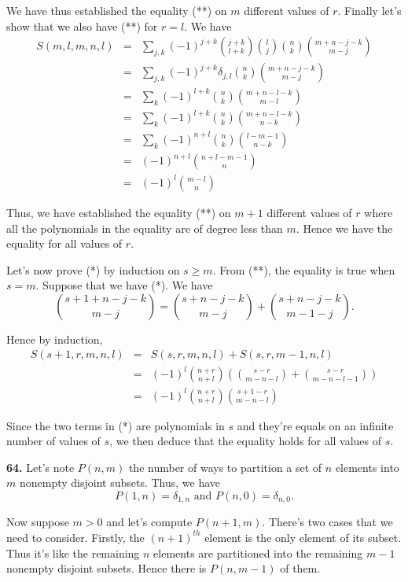 \documentclass[a4paper,12pt]{article}
\newcommand{\newpar}[1]{\bigskip \noindent \textbf{#1.}}
\begin{document}
We have thus established the equality (**) on $m$ different values of
$r$.  Finally let's show that we also have (**) for $r = l$.   We have
\begin{eqnarray*}
  S(m,l,m,n,l) &=& \sum_{j,k}(-1)^{j+k}{j+k \choose l+k}{l \choose
    j}{n \choose k}{m+n-j-k\choose m-j} \\
  &=& \sum_{j,k} (-1)^{j+k} \delta_{j,l} {n \choose k}{m+n-j-k \choose
    m-j} \\
  &=& \sum_k (-1)^{l+k}{n \choose k}{m+n-l-k \choose m-l} \\
  &=& \sum_k (-1)^{l+k}{n \choose k}{m+n-l-k \choose n-k} \\
  &=& \sum_k (-1)^{n+l}{n \choose k}{l-m-1 \choose n-k} \\
  &=& (-1)^{n+l} {n+l-m-1 \choose n} \\
  &=& (-1)^l {m-l \choose n}
\end{eqnarray*}

Thus, we have established the equality (**) on $m+1$ different values
of $r$ where all the polynomials in the equality are of degree less
than $m$.  Hence we have the equality for all values of $r$.

Let's now prove (*) by induction on $s \ge m$.  From (**), the
equality is true when $s = m$.  Suppose that we have (*).  We have
\[ {s+1 + n-j-k\choose m-j} = {s+n-j-k\choose m-j} + {s+n-j-k\choose
  m-1-j}.\]

Hence by induction,
\begin{eqnarray*}
  S(s+1, r, m, n, l) &=& S(s, r, m, n, l) + S(s, r, m-1, n, l) \\
  &=& (-1)^l {n+r\choose n+l}\left({s-r\choose m-n-l} + {s-r\choose
    m-n-l-1}\right) \\
  &=& (-1)^l {n+r \choose n+l}{s+1-r\choose m-n-l}
\end{eqnarray*}

Since the two terms in (*) are polynomials in $s$ and they're equals
on an infinite number of values of $s$, we then deduce that the
equality holds for all values of $s$.

\newpar{64} Let's note $P(n, m)$ the number of ways to partition a set
of $n$ elements into $m$ nonempty disjoint subsets.  Thus, we have
\[ P(1, n) = \delta_{1,n} \mbox{ and } P(n, 0) = \delta_{n, 0}.\]

Now suppose $m > 0$ and let's compute $P(n+1, m)$.  There's two cases
that we need to consider.  Firstly, the $(n+1)^{th}$ element is the
only element of its subset.  Thus it's like the remaining $n$ elements
are partitioned into the remaining $m-1$ nonempty disjoint subsets.
Hence there is $P(n, m-1)$ of them.
\end{document}
